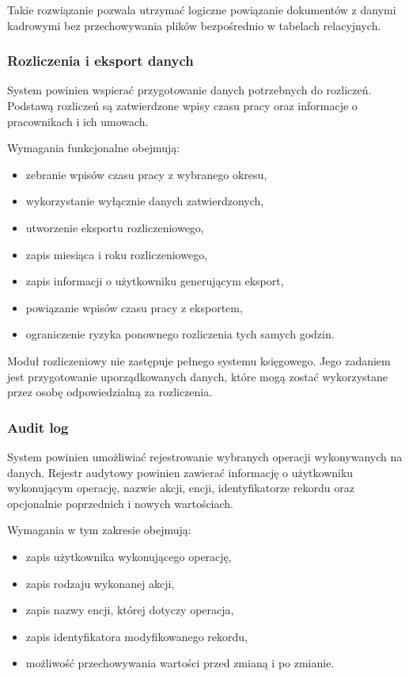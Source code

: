 Takie rozwiązanie pozwala utrzymać logiczne powiązanie dokumentów z danymi kadrowymi bez przechowywania plików bezpośrednio w tabelach relacyjnych.

\subsubsection{Rozliczenia i eksport danych}

System powinien wspierać przygotowanie danych potrzebnych do rozliczeń. Podstawą rozliczeń są zatwierdzone wpisy czasu pracy oraz informacje o pracownikach i ich umowach.

Wymagania funkcjonalne obejmują:
\begin{itemize}
    \item zebranie wpisów czasu pracy z wybranego okresu,
    \item wykorzystanie wyłącznie danych zatwierdzonych,
    \item utworzenie eksportu rozliczeniowego,
    \item zapis miesiąca i roku rozliczeniowego,
    \item zapis informacji o użytkowniku generującym eksport,
    \item powiązanie wpisów czasu pracy z eksportem,
    \item ograniczenie ryzyka ponownego rozliczenia tych samych godzin.
\end{itemize}

Moduł rozliczeniowy nie zastępuje pełnego systemu księgowego. Jego zadaniem jest przygotowanie uporządkowanych danych, które mogą zostać wykorzystane przez osobę odpowiedzialną za rozliczenia.

\subsubsection{Audit log}

System powinien umożliwiać rejestrowanie wybranych operacji wykonywanych na danych. Rejestr audytowy powinien zawierać informację o użytkowniku wykonującym operację, nazwie akcji, encji, identyfikatorze rekordu oraz opcjonalnie poprzednich i nowych wartościach.

Wymagania w tym zakresie obejmują:
\begin{itemize}
    \item zapis użytkownika wykonującego operację,
    \item zapis rodzaju wykonanej akcji,
    \item zapis nazwy encji, której dotyczy operacja,
    \item zapis identyfikatora modyfikowanego rekordu,
    \item możliwość przechowywania wartości przed zmianą i po zmianie.
\end{itemize}

